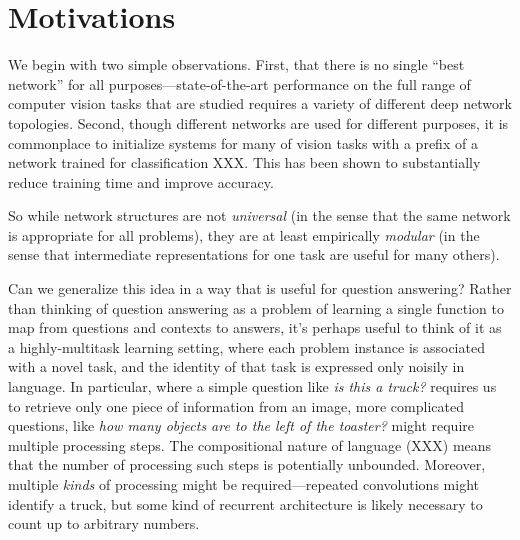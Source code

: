 \documentclass[10pt,twocolumn,letterpaper]{article}
\begin{document}


\section{Motivations}

%
We begin with two simple observations. First, that there is no single ``best
network'' for all purposes---state-of-the-art performance on the full range of
computer vision tasks that are studied requires a variety of different deep
network topologies. Second, though different networks are used for different
purposes, it is commonplace to initialize systems for many of vision tasks with
a prefix of a network trained for classification \cite{Long14FullyConvolutional} XXX. 
This has been shown to substantially reduce training time and improve accuracy. 

So while network structures are not \emph{universal} (in the sense that the same
network is appropriate for all problems), they are at least empirically
\emph{modular} (in the sense that intermediate representations for one task are
useful for many others). 

Can we generalize this idea in a way that is useful for question answering?
Rather than thinking of question answering as a problem of learning a single
function to map from questions and contexts to answers, it's perhaps useful to
think of it as a highly-multitask learning setting, where each problem instance
is associated with a novel task, and the identity of that task is expressed only
noisily in language. In particular, where a simple question like \emph{is this a
truck?} requires us to retrieve only one piece of information from an image,
more complicated questions, like \emph{how many objects are to the left of
the toaster?} might require multiple processing steps. The compositional nature
of language (XXX) means that the number of processing such steps is potentially
unbounded. Moreover, multiple \emph{kinds} of processing might be
required---repeated convolutions might identify a truck, but some kind of
recurrent architecture is likely necessary to count up to arbitrary numbers.
\end{document}
